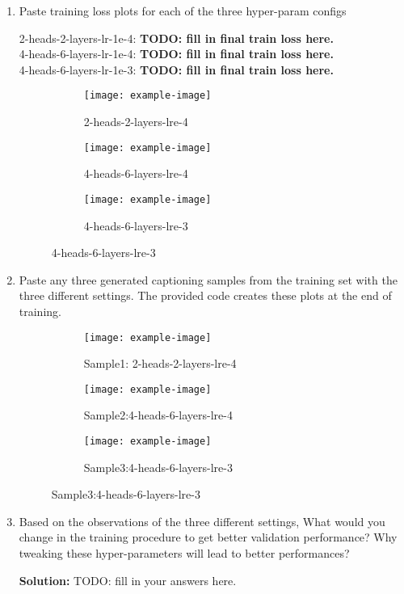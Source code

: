 \documentclass{article}
\begin{document}
\begin{enumerate}

    \item Paste training loss plots for each of the three hyper-param configs

    2-heads-2-layers-lr-1e-4: \textbf{TODO: fill in final train loss here.} \\
    4-heads-6-layers-lr-1e-4: \textbf{TODO: fill in final train loss here.} \\
    4-heads-6-layers-lr-1e-3: \textbf{TODO: fill in final train loss here.} 

    \begin{figure}[H]
    \centering
    \begin{subfigure}[b]{0.32\linewidth}
        \texttt{[image: example-image]}
        \caption{2-heads-2-layers-lre-4}
    \end{subfigure}
    \begin{subfigure}[b]{0.32\linewidth}
        \texttt{[image: example-image]}
        \caption{4-heads-6-layers-lre-4}
    \end{subfigure}
    \begin{subfigure}[b]{0.32\linewidth}
        \texttt{[image: example-image]}
        \caption{4-heads-6-layers-lre-3}
    \end{subfigure}
    
    \end{figure}

    \item Paste any three generated captioning samples from the training set with the three different settings. The provided code creates these plots at the end of training.

    \begin{figure}[H]
    \centering
    \begin{subfigure}[b]{0.32\linewidth}
        \texttt{[image: example-image]}
        \caption{Sample1: 2-heads-2-layers-lre-4}
    \end{subfigure}
    \begin{subfigure}[b]{0.32\linewidth}
        \texttt{[image: example-image]}
        \caption{Sample2:4-heads-6-layers-lre-4}
    \end{subfigure}
    \begin{subfigure}[b]{0.32\linewidth}
        \texttt{[image: example-image]}
        \caption{Sample3:4-heads-6-layers-lre-3}
    \end{subfigure}
\end{figure}


    \item Based on the observations of the three different settings, What would you change in the training procedure to get better validation performance? Why tweaking these hyper-parameters will lead to better performances?

    \textbf{Solution:}
    TODO: fill in your answers here.

\end{enumerate}
    
\end{document}
